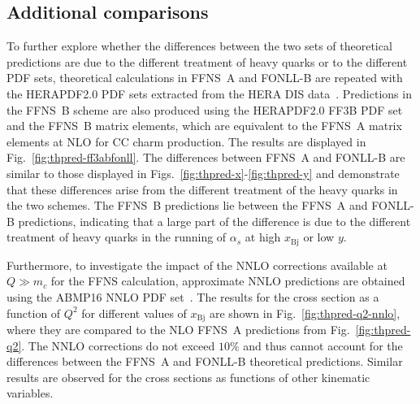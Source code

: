 \documentclass[pdftex,twocolumn,epjc3]{svjour3}          %
\newcommand{\abmp} {ABMP16\xspace}
\newcommand{\xbj}{\ensuremath{x_{\text{Bj}}}\xspace}
\newcommand{\fonll} {{FONLL-B}\xspace}
\newcommand{\ffns} {{FFNS~A}\xspace}
\newcommand{\ffnsb} {{FFNS~B}\xspace}
\newcommand{\ffthreeb} {{\hbox{HERAPDF2.0} FF3B}\xspace}
\begin{document}


\subsection{Additional comparisons}
\label{sec:compareII}

To further explore whether the differences between the two sets of
theoretical predictions are due to the different treatment of heavy
quarks or to the different PDF sets, theoretical calculations in \ffns
and \fonll are repeated with the HERAPDF2.0 PDF sets extracted from
the HERA DIS data~\cite{Abramowicz:2015mha}.
%
Predictions in the \ffnsb scheme are also produced using the \ffthreeb
PDF set and the \ffnsb matrix elements, which are equivalent to the
\ffns matrix elements at NLO for CC charm production. The results are
displayed in Fig.~\ref{fig:thpred-ff3abfonll}. The differences between
\ffns and \fonll are similar to those displayed in
Figs.~\ref{fig:thpred-x}-\ref{fig:thpred-y} and demonstrate that these
differences arise from the different treatment of the heavy quarks in
the two schemes. The \ffnsb predictions lie between the \ffns and
\fonll predictions, indicating that a large part of the difference
is due to the different treatment of heavy quarks in the running of
$\alpha_s$ at high \xbj or low $y$.


Furthermore, to investigate the impact of the NNLO corrections
available at $Q \gg m_c$ for the FFNS calculation, approximate NNLO
predictions are obtained using the \abmp NNLO PDF
set~\cite{Alekhin:2017kpj}. The results for the cross section as a
function of $Q^2$ for different values of \xbj are shown in
Fig.~\ref{fig:thpred-q2-nnlo}, where they are compared to the NLO
\ffns predictions from Fig.~\ref{fig:thpred-q2}. The NNLO corrections
do not exceed $10\%$ and thus cannot account for the differences
between the \ffns and \fonll theoretical predictions. Similar results
are observed for the cross sections as functions of other kinematic
variables.

\end{document}
